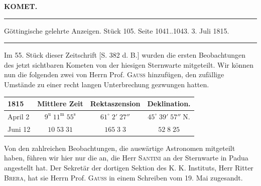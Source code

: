 \clearpage{}\hypertarget{native-390-lower}{}\label{native-390-lower}
\begin{center}\textbf{KOMET.}\par\vspace{4pt}\hrule\vspace{4pt}\fontsize{10}{12}\selectfont Göttingische gelehrte Anzeigen. Stück 105. Seite 1041..1043. 3. Juli 1815.\par\vspace{4pt}\hrule\vspace{4pt}\end{center}

\par\indent Im 55. Stück dieser Zeitschrift [S. 382 d. B.] wurden die ersten Beobachtungen des jetzt sichtbaren Kometen von der hiesigen Sternwarte mitgeteilt. Wir können nun die folgenden zwei von Herrn Prof. \textsc{Gauss} hinzufügen, den zufällige Umstände zu einer recht langen Unterbrechung gezwungen hatten.

\begin{center}\fontsize{10}{12}\selectfont\setlength{\tabcolsep}{4pt}\renewcommand{\arraystretch}{1.15}\begin{tabular}{l|c|c|c}
1815 & Mittlere Zeit & Rektaszension & Deklination.\\\hline
April 2 & $9^{\mathrm u}\;11^{\mathrm m}\;55^{\mathrm s}$ & $61^\circ\;2'\;27''$ & $45^\circ\;39'\;57''\;\mathrm{N.}$\\
Juni 12 & $10\;53\;31$ & $165\;3\;3$ & $52\;8\;25$\\
\end{tabular}\end{center}

\par\indent Von den zahlreichen Beobachtungen, die auswärtige Astronomen mitgeteilt haben, führen wir hier nur die an, die Herr \textsc{Santini} an der Sternwarte in Padua angestellt hat. Der Sekretär der dortigen Sektion des K. K. Instituts, Herr Ritter \textsc{Brera}, hat sie Herrn Prof. \textsc{Gauss} in einem Schreiben vom 19. Mai zugesandt.

